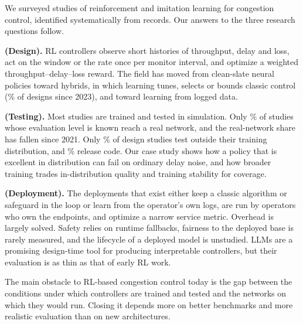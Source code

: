 We surveyed \nStudies{} studies of reinforcement and imitation learning for congestion control, identified systematically from \nIdentifiedTotal{} records. Our answers to the three research questions follow.

\noindent\textbf{ (Design).} RL controllers observe short histories of throughput, delay and loss, act on the window or the rate once per monitor interval, and optimize a weighted throughput--delay--loss reward. The field has moved from clean-slate neural policies toward hybrids, in which learning tunes, selects or bounds classic control (\nPctHybridPost\% of designs since 2023), and toward learning from logged data.

\noindent\textbf{ (Testing).} Most studies are trained and tested in simulation. Only \nPctRealOfKnown\% of studies whose evaluation level is known reach a real network, and the real-network share has fallen since 2021. Only \nPctGen\% of design studies test outside their training distribution, and \nPctCodeDesign\% release code. Our case study shows how a policy that is excellent in distribution can fail on ordinary delay noise, and how broader training trades in-distribution quality and training stability for coverage.

\noindent\textbf{ (Deployment).} The deployments that exist either keep a classic algorithm or safeguard in the loop or learn from the operator's own logs, are run by operators who own the endpoints, and optimize a narrow service metric. Overhead is largely solved. Safety relies on runtime fallbacks, fairness to the deployed base is rarely measured, and the lifecycle of a deployed model is unstudied. LLMs are a promising design-time tool for producing interpretable controllers, but their evaluation is as thin as that of early RL work.

\noindent The main obstacle to RL-based congestion control today is the gap between the conditions under which controllers are trained and tested and the networks on which they would run. Closing it depends more on better benchmarks and more realistic evaluation than on new architectures.
